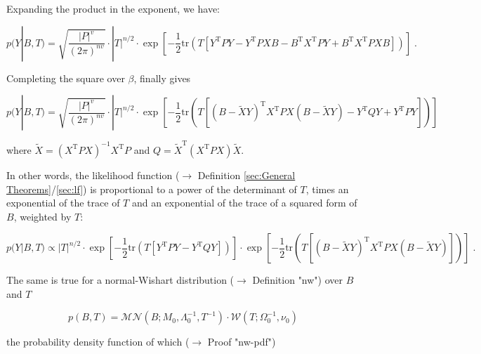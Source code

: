 \documentclass[a4paper,12pt,twoside]{book}
\begin{document}
Expanding the product in the exponent, we have:

\begin{equation} \label{eq:mblr-prior-GLM-LF-s2}
p(Y|B,T) = \sqrt{\frac{|P|^v}{(2 \pi)^{nv}}} \cdot |T|^{n/2} \cdot \exp\left[ -\frac{1}{2} \mathrm{tr}\left( T \left[ Y^\mathrm{T} P Y - Y^\mathrm{T} P X B - B^\mathrm{T} X^\mathrm{T} P Y + B^\mathrm{T} X^\mathrm{T} P X B \right] \right) \right] \; .
\end{equation}

Completing the square over $\beta$, finally gives

\begin{equation} \label{eq:mblr-prior-GLM-LF-s3}
p(Y|B,T) = \sqrt{\frac{|P|^v}{(2 \pi)^{nv}}} \cdot |T|^{n/2} \cdot \exp\left[ -\frac{1}{2} \mathrm{tr}\left( T \left[ (B - \tilde{X}Y)^\mathrm{T} X^\mathrm{T} P X (B - \tilde{X}Y) - Y^\mathrm{T} Q Y + Y^\mathrm{T} P Y \right] \right) \right]
\end{equation}

where $\tilde{X} = \left( X^\mathrm{T} P X \right)^{-1} X^\mathrm{T} P$ and $Q = \tilde{X}^\mathrm{T} \left( X^\mathrm{T} P X \right) \tilde{X}$.

\vspace{1em}
In other words, the likelihood function ($\rightarrow$ Definition \ref{sec:General Theorems}/\ref{sec:lf}) is proportional to a power of the determinant of $T$, times an exponential of the trace of $T$ and an exponential of the trace of a squared form of $B$, weighted by $T$:

\begin{equation} \label{eq:mblr-prior-GLM-LF-s4}
p(Y|B,T) \propto |T|^{n/2} \cdot \exp\left[ -\frac{1}{2} \mathrm{tr}\left( T \left[ Y^\mathrm{T} P Y - Y^\mathrm{T} Q Y \right] \right) \right] \cdot \exp\left[ -\frac{1}{2} \mathrm{tr}\left( T \left[ (B - \tilde{X}Y)^\mathrm{T} X^\mathrm{T} P X (B - \tilde{X}Y) \right] \right) \right] \; .
\end{equation}

The same is true for a normal-Wishart distribution ($\rightarrow$ Definition "nw") over $B$ and $T$

\begin{equation} \label{eq:mblr-prior-MBLR-prior-s1}
p(B,T) = \mathcal{MN}(B; M_0, \Lambda_0^{-1}, T^{-1}) \cdot \mathcal{W}(T; \Omega_0^{-1}, \nu_0)
\end{equation}

the probability density function of which ($\rightarrow$ Proof "nw-pdf")
\end{document}
